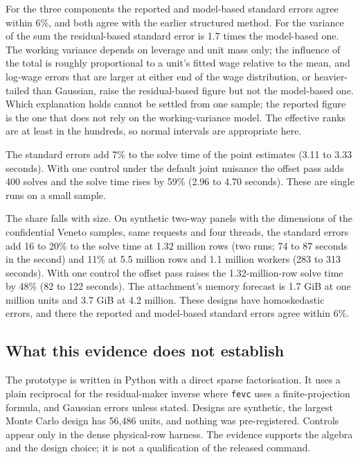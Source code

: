\documentclass[11pt]{article}
\newcommand{\fevc}{\texttt{fevc}}
\begin{document}
For the three components the reported and model-based standard errors agree
within 6\%, and both agree with the earlier structured method. For the
variance of the sum the residual-based standard error is 1.7 times the
model-based one. The working variance depends on leverage and unit mass only;
the influence of the total is roughly proportional to a unit's fitted wage
relative to the mean, and log-wage errors that are larger at either end of
the wage distribution, or heavier-tailed than Gaussian, raise the
residual-based figure but not the model-based one. Which explanation holds
cannot be settled from one sample; the reported figure is the one that does
not rely on the working-variance model. The effective ranks are at least in the
hundreds, so normal intervals are appropriate here.

The standard errors add 7\% to the solve time of the point estimates (3.11 to
3.33 seconds). With one control under the default joint nuisance the offset
pass adds 400 solves and the solve time rises by 59\% (2.96 to 4.70 seconds).
These are single runs on a small sample.

The share falls with size. On synthetic two-way panels with the dimensions
of the confidential Veneto samples, same requests and four threads, the
standard errors add 16 to 20\% to the solve time at 1.32 million rows (two
runs; 74 to 87 seconds in the second) and 11\% at 5.5 million rows and 1.1
million workers (283 to 313 seconds). With one control the offset pass
raises the 1.32-million-row solve time by 48\% (82 to 122 seconds). The
attachment's memory forecast is 1.7 GiB at one million units and 3.7 GiB at
4.2 million. These designs have homoskedastic errors, and there the reported
and model-based standard errors agree within 6\%.

\subsection{What this evidence does not establish}

The prototype is written in Python with a direct sparse factorisation. It
uses a plain reciprocal for the residual-maker inverse where \fevc{} uses a
finite-projection formula, and Gaussian errors unless stated. Designs are
synthetic, the largest Monte Carlo design has 56,486 units, and nothing was
pre-registered. Controls appear only in the dense physical-row harness. The
evidence supports the algebra and the design choice; it is not a
qualification of the released command.
\end{document}

